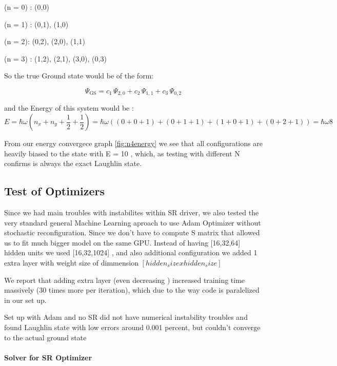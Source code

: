 \documentclass[a4paper,11pt,twoside]{article}
\begin{document}
(n = 0) : (0,0)

(n = 1) : (0,1), (1,0)

(n = 2): (0,2), (2,0), (1,1) 

(n = 3) : (1,2), (2,1), (3,0), (0,3)

 
So the true Ground state would be of the form: 

\begin{equation}
\Psi_{\mathrm{GS}}
=
c_1\,\Psi_{2,0}
+
c_2\,\Psi_{1,1}
+
c_3\,\Psi_{0,2}
\end{equation}

and the Energy of this system would be : 
\begin{equation}
    E = \hbar \omega ( n_x + n_y + \frac{1}{2} + \frac{1}{2}) =  \hbar \omega  (( 0 + 0 + 1 ) + ( 0 + 1 + 1  )  +  ( 1 + 0 + 1  ) + ( 0 + 2 + 1  )) =  \hbar \omega 8
\end{equation}


From our energy convergece graph \ref{fig:n4energy} we see that all configurations are heavily biased to the state with E = 10 , which, as testing with different N confirms is always the exact Laughlin state. 

\subsection{Test of Optimizers}

Since we had main troubles with instabilites within SR driver, we also tested the very standard general Machine Learning aproach to use Adam Optimizer without stochastic reconfiguration. Since we don't have to compute S matrix that allowed us to fit much bigger model on the same GPU. 
Instead of having [16,32,64] hidden units we used  [16,32,1024] , and also additional configuration we added 1 extra layer with weight size of dimmension $[hidden_size x hidden_size]$

We report that adding extra layer (even decreasing ) increased training time massively (30 times more per iteration), which due to the way code is paralelized in our set up. 

Set up with Adam and no SR did not have numerical instability troubles and found Laughlin state with low errors around 0.001 percent, but couldn't converge to the actual ground state  

\paragraph{Solver for SR Optimizer}
\end{document}
